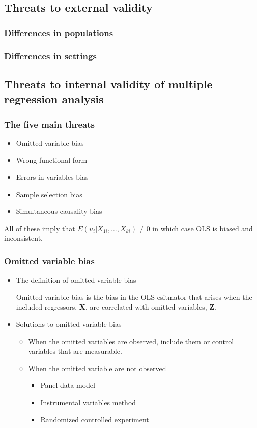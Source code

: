 \documentclass[a4paper,10pt]{article}
\begin{document}
\subsection{Threats to external validity}
\label{sec:org1702159}
\subsubsection*{Differences in populations}
\label{sec:orgc135023}
\subsubsection*{Differences in settings}
\label{sec:orgab8a531}

\subsection{Threats to internal validity of multiple regression analysis}
\label{sec:orga2c285d}
\subsubsection*{The five main threats}
\label{sec:org293a488}
\begin{itemize}
\item Omitted variable bias
\item Wrong functional form
\item Errors-in-variables bias
\item Sample selection bias
\item Simultaneous causality bias
\end{itemize}

All of these imply that \(E(u_i|X_{1i},…,X_{ki}) \neq 0\) in which case
OLS is biased and inconsistent.  

\subsubsection*{Omitted variable bias}
\label{sec:orgc09f1e4}
\begin{itemize}
\item The definition of omitted variable bias
\label{sec:org2ced56b}

Omitted variable bias is the bias in the OLS esitmator that arises
when the included regressors, \(\mathbf{X}\), are correlated with
omitted variables, \(\mathbf{Z}\). 

\item Solutions to omitted variable bias
\label{sec:org294d743}
\begin{itemize}
\item When the omitted variables are observed, include them or control
variables that are measurable.
\item When the omitted variable are not observed
\begin{itemize}
\item Panel data model
\item Instrumental variables method
\item Randomized controlled experiment
\end{itemize}
\end{itemize}
\end{itemize}
\end{document}
